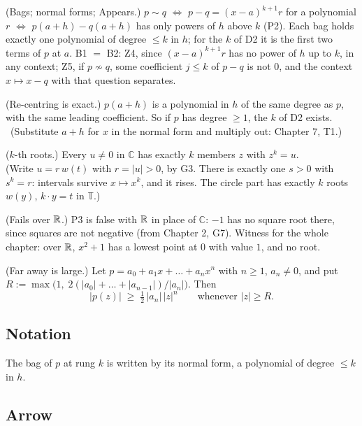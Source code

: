 \begin{lines}
\item[\lab{P1}] (Bags; normal forms; Appears.) $p \sim q$ $\iff$ $p - q = (x - a)^{k+1} r$ for a polynomial $r$ $\iff$ $p(a + h) - q(a + h)$ has only powers of $h$ above $k$ (P2). Each bag holds exactly one polynomial of degree $\le k$ in $h$; for the $k$ of D2 it is the first two terms of $p$ at $a$. B1 $=$ B2: Z4, since $(x - a)^{k+1} r$ has no power of $h$ up to $k$, in any context; Z5, if $p \not\sim q$, some coefficient $j \le k$ of $p - q$ is not $0$, and the context $x \mapsto x - q$ with that question separates.
\item[\lab{P2}] (Re-centring is exact.) $p(a + h)$ is a polynomial in $h$ of the same degree as $p$, with the same leading coefficient. So if $p$ has degree $\ge 1$, the $k$ of D2 exists. \ (Substitute $a + h$ for $x$ in the normal form and multiply out: Chapter 7, T1.)
\item[\lab{P3}] ($k$-th roots.) Every $u \neq 0$ in $\mathbb{C}$ has exactly $k$ members $z$ with $z^k = u$. \\
(Write $u = r\,w(t)$ with $r = |u| > 0$, by G3. There is exactly one $s > 0$ with $s^k = r$: intervals survive $x \mapsto x^k$, and it rises. The circle part has exactly $k$ roots $w(y)$, $k \cdot y = t$ in $\mathbb{T}$.)
\item[\lab{P4}] (Fails over $\mathbb{R}$.) P3 is false with $\mathbb{R}$ in place of $\mathbb{C}$: $-1$ has no square root there, since squares are not negative (from Chapter 2, G7). Witness for the whole chapter: over $\mathbb{R}$, $x^2 + 1$ has a lowest point at $0$ with value $1$, and no root.
\item[\lab{P5}] (Far away is large.) Let $p = a_0 + a_1 x + \dots + a_n x^n$ with $n \ge 1$, $a_n \neq 0$, and put $R := \max\bigl(1,\; 2(|a_0| + \dots + |a_{n-1}|)/|a_n|\bigr)$. Then
\[
|p(z)| \;\ge\; \tfrac12\,|a_n|\,|z|^n \qquad\text{whenever } |z| \ge R .
\]
\end{lines}

\subsection*{Notation}

\begin{lines}
\item[\lab{N1}] The bag of $p$ at rung $k$ is written by its normal form, a polynomial of degree $\le k$ in $h$.
\end{lines}

\subsection*{Arrow}


